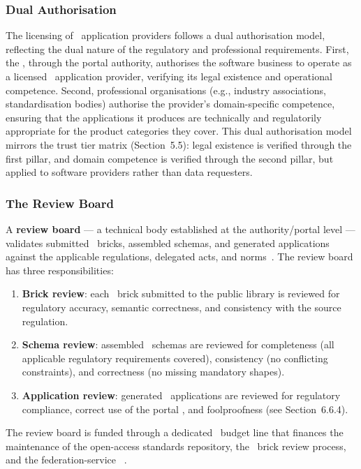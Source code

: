 \subsubsection{Dual Authorisation}

The licensing of \DPP\ application providers follows a dual authorisation model,
reflecting the dual nature of the regulatory and professional requirements.
First, the \EC, through the portal authority, authorises the software business
to operate as a licensed \DPP\ application provider, verifying its legal
existence and operational competence. Second, professional organisations (e.g.,
industry associations, standardisation bodies) authorise the provider's
domain-specific competence, ensuring that the applications it produces are
technically and regulatorily appropriate for the product categories they cover.
This dual authorisation model mirrors the trust tier matrix (Section~5.5): legal
existence is verified through the first pillar, and domain competence is
verified through the second pillar, but applied to software providers rather
than data requesters.

\subsubsection{The Review Board}

A \textbf{review board} --- a technical body established at the authority/portal
level --- validates submitted \SHACL\ bricks, assembled schemas, and generated
applications against the applicable regulations, delegated acts, and
norms~\cite{dpp4eu2026_postconf}. The review board has three responsibilities:

\begin{enumerate}
\item \textbf{Brick review}: each \SHACL\ brick submitted to the public library
is reviewed for regulatory accuracy, semantic correctness, and consistency with
the source regulation.
\item \textbf{Schema review}: assembled \SHACL\ schemas are reviewed for
completeness (all applicable regulatory requirements covered), consistency (no
conflicting constraints), and correctness (no missing mandatory shapes).
\item \textbf{Application review}: generated \DPP\ applications are reviewed for
regulatory compliance, correct use of the portal \API, and foolproofness (see
Section~6.6.4).
\end{enumerate}

The review board is funded through a dedicated \EU\ budget line that finances
the maintenance of the open-access standards repository, the \SHACL\ brick
review process, and the federation-service \APIs~\cite{dpp4eu2026_postconf}.

